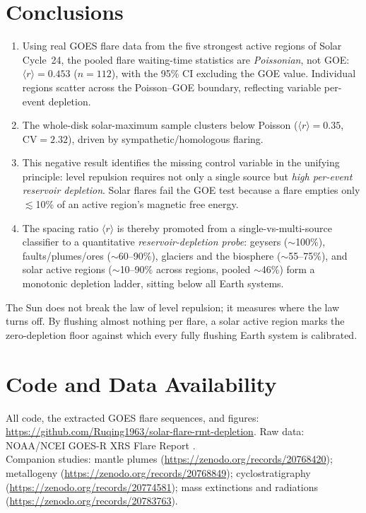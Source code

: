 \documentclass[12pt,a4paper]{article}
\begin{document}
\section{Conclusions}

\begin{enumerate}
\item Using real GOES flare data from the five strongest active regions of Solar Cycle~24, the pooled flare waiting-time statistics are \emph{Poissonian}, not GOE: $\langle r\rangle=0.453$ ($n=112$), with the 95\% CI excluding the GOE value. Individual regions scatter across the Poisson--GOE boundary, reflecting variable per-event depletion.
\item The whole-disk solar-maximum sample clusters below Poisson ($\langle r\rangle=0.35$, $\mathrm{CV}=2.32$), driven by sympathetic/homologous flaring.
\item This negative result identifies the missing control variable in the unifying principle: level repulsion requires not only a single source but \emph{high per-event reservoir depletion}. Solar flares fail the GOE test because a flare empties only $\lesssim$10\% of an active region's magnetic free energy.
\item The spacing ratio $\langle r\rangle$ is thereby promoted from a single-vs-multi-source classifier to a quantitative \emph{reservoir-depletion probe}: geysers ($\sim$100\%), faults/plumes/ores ($\sim$60--90\%), glaciers and the biosphere ($\sim$55--75\%), and solar active regions ($\sim$10--90\% across regions, pooled $\sim$46\%) form a monotonic depletion ladder, sitting below all Earth systems.
\end{enumerate}

The Sun does not break the law of level repulsion; it measures where the law turns off. By flushing almost nothing per flare, a solar active region marks the zero-depletion floor against which every fully flushing Earth system is calibrated.

\section*{Code and Data Availability}
All code, the extracted GOES flare sequences, and figures: \url{https://github.com/Ruqing1963/solar-flare-rmt-depletion}. Raw data: NOAA/NCEI GOES-R XRS Flare Report \citep{nceiflrpt}.\\
Companion studies: mantle plumes (\url{https://zenodo.org/records/20768420}); metallogeny (\url{https://zenodo.org/records/20768849}); cyclostratigraphy (\url{https://zenodo.org/records/20774581}); mass extinctions and radiations (\url{https://zenodo.org/records/20783763}).
\end{document}
